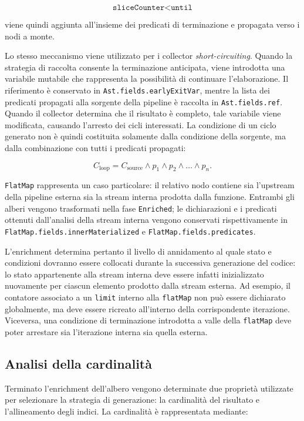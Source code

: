 \documentclass[a4paper,11pt]{report}
\theoremstyle{definition}
\begin{document}
\[
  \texttt{sliceCounter} < \texttt{until}
\]

viene quindi aggiunta all'insieme dei predicati di terminazione e propagata verso i nodi a monte.

Lo stesso meccanismo viene utilizzato per i collector \emph{short-circuiting}. Quando la strategia di raccolta consente la terminazione anticipata, viene introdotta una variabile mutabile che rappresenta la possibilità di continuare l'elaborazione. Il riferimento è conservato in \texttt{Ast.fields.earlyExitVar}, mentre la lista dei predicati propagati alla sorgente della pipeline è raccolta in \texttt{Ast.fields.ref}. Quando il collector determina che il risultato è completo, tale variabile viene modificata, causando l'arresto dei cicli interessati. La condizione di un ciclo generato non è quindi costituita solamente dalla condizione della sorgente, ma dalla combinazione con tutti i predicati propagati:

\[
  C_{\mathrm{loop}}
  =
  C_{\mathrm{source}}
  \land
  p_1
  \land
  p_2
  \land \dots \land
  p_n.
\]

\texttt{FlatMap} rappresenta un caso particolare: il relativo nodo contiene sia l'upstream della pipeline esterna sia la stream interna prodotta dalla funzione. Entrambi gli alberi vengono trasformati nella fase \texttt{Enriched}; le dichiarazioni e i predicati ottenuti dall'analisi della stream interna vengono conservati rispettivamente in \texttt{FlatMap.fields.innerMaterialized} e \texttt{FlatMap.fields.predicates}.

L'enrichment determina pertanto il livello di annidamento al quale stato e condizioni dovranno essere collocati durante la successiva generazione del codice: lo stato appartenente alla stream interna deve essere infatti inizializzato nuovamente per ciascun elemento prodotto dalla stream esterna. Ad esempio, il contatore associato a un \texttt{limit} interno alla \texttt{flatMap} non può essere dichiarato globalmente, ma deve essere ricreato all'interno della corrispondente iterazione. Viceversa, una condizione di terminazione introdotta a valle della \texttt{flatMap} deve poter arrestare sia l'iterazione interna sia quella esterna.

\subsection{Analisi della cardinalità}

Terminato l'enrichment dell'albero vengono determinate due proprietà utilizzate per selezionare la strategia di generazione: la cardinalità del risultato e l'allineamento degli indici. La cardinalità è rappresentata mediante:
\end{document}
